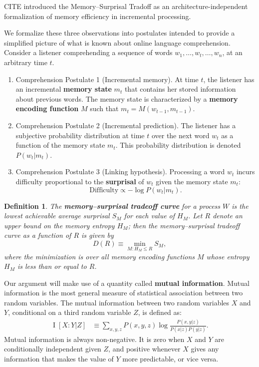 \documentclass[11pt,letterpaper]{article}
\newcommand{\key}[1]{\textbf{#1}}
\newcounter{theorem}
\newtheorem{definition}[theorem]{Definition}
\begin{document}
CITE introduced the Memory--Surprisal Tradoff as an architecture-independent formalization of memory efficiency in incremental processing.


We formalize these three observations into postulates intended to provide a simplified picture of what is known about online language comprehension. Consider a listener comprehending a sequence of words $w_1, \dots, w_t, \dots, w_n$, at an arbitrary time $t$.
\begin{enumerate}
    \item Comprehension Postulate 1 (Incremental memory). At time $t$, the listener has an incremental \key{memory state} $m_t$ that contains her stored information about previous words. The memory state is characterized by a \key{memory encoding function} $M$ such that $m_t = M(w_{t-1}, m_{t-1})$.
    \item Comprehension Postulate 2 (Incremental prediction). The listener has a subjective probability distribution at time $t$ over the next word $w_t$ as a function of the memory state $m_t$. This probability distribution is denoted $P(w_t|m_t)$.
    \item Comprehension Postulate 3 (Linking hypothesis). Processing a word $w_t$ incurs difficulty proportional to the \key{surprisal} of $w_t$ given the memory state $m_t$:
    \begin{equation}
    \label{eq:lossy-surp}
    \text{Difficulty} \propto -\log P(w_t | m_t).
\end{equation}
\end{enumerate}

\begin{definition}
The \key{memory--surprisal tradeoff curve} for a process $W$ is the lowest achievable average surprisal $S_M$ for each value of $H_M$. Let $R$ denote an upper bound on the memory entropy $H_M$; then the memory--surprisal tradeoff curve as a function of $R$ is given by
\begin{equation}
    \label{eq:ms-formal}
    D(R) \equiv \min_{M : H_M \le R} S_M,
\end{equation}
where the minimization is over all memory encoding functions $M$ whose entropy $H_M$ is less than or equal to $R$.
\end{definition}

Our argument will make use of a quantity called \key{mutual information}. Mutual information is the most general measure of statistical association between two random variables. The mutual information between two random variables $X$ and $Y$, conditional on a third random variable $Z$, is defined as:
\begin{align}
\label{eq:mi}
    \operatorname{I}[X:Y|Z] &\equiv \sum_{x,y,z} P(x,y,z) \log \frac{P(x,y|z)}{P(x|z)P(y|z)}. %
\end{align}
Mutual information is always non-negative. It is zero when $X$ and $Y$ are conditionally independent given $Z$, and positive whenever $X$ gives any information that makes the value of $Y$ more predictable, or vice versa. 
\end{document}
